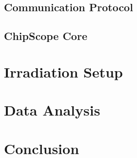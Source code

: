     \subsection{Communication Protocol}

    \subsection{ChipScope Core}

  \section{Irradiation Setup}

  \section{Data Analysis}

  \section{Conclusion}
